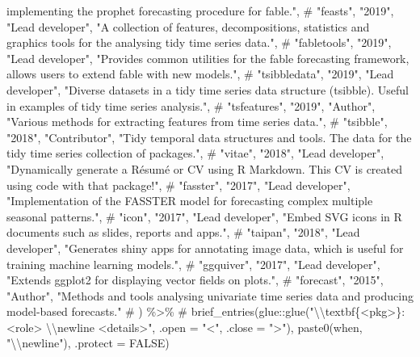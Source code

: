 \documentclass[11pt,a4paper,]{awesome-cv}
\begin{document}
{implementing the prophet forecasting procedure for fable.", \# "feasts", "2019", "Lead developer", "A collection of features, decompositions, statistics and graphics tools for the analysing tidy time series data.", \# "fabletools", "2019", "Lead developer", "Provides common utilities for the fable forecasting framework, allows users to extend fable with new models.", \# "tsibbledata", "2019", "Lead developer", "Diverse datasets in a tidy time series data structure (tsibble). Useful in examples of tidy time series analysis.", \# "tsfeatures", "2019", "Author", "Various methods for extracting features from time series data.", \# "tsibble", "2018", "Contributor", "Tidy temporal data structures and tools. The data for the tidy time series collection of packages.", \# "vitae", "2018", "Lead developer", "Dynamically generate a Résumé or CV using R Markdown. This CV is created using code with that package!", \# "fasster", "2017", "Lead developer", "Implementation of the FASSTER model for forecasting complex multiple seasonal patterns.", \# "icon", "2017", "Lead developer", "Embed SVG icons in R documents such as slides, reports and apps.", \# "taipan", "2018", "Lead developer", "Generates shiny apps for annotating image data, which is useful for training machine learning models.", \#  "ggquiver", "2017", "Lead developer", "Extends ggplot2 for displaying vector fields on plots.", \# "forecast", "2015", "Author", "Methods and tools analysing univariate time series data and producing model-based forecasts." \# ) \%\textgreater\%  \# brief\_entries(glue::glue("\textbackslash\textbackslash textbf\{\textless pkg\textgreater\}: \textless role\textgreater{} \textbackslash\textbackslash newline \textless details\textgreater", .open = "\textless", .close = "\textgreater"), paste0(when, "\textbackslash\textbackslash newline"), .protect = FALSE) }
\end{document}
